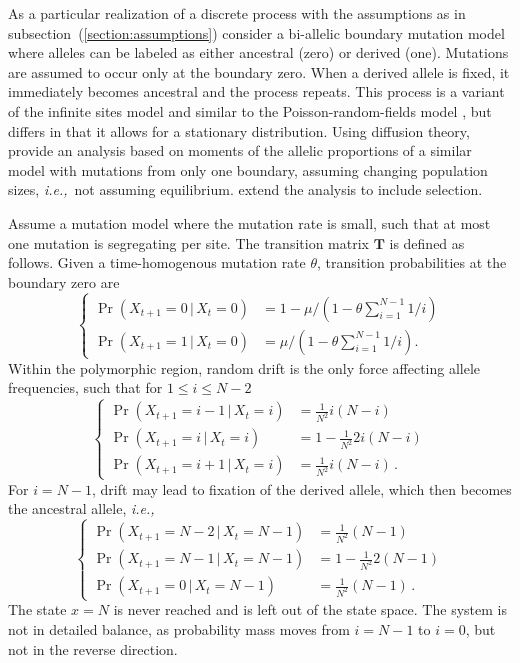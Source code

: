 \documentclass[preprint]{elsarticle}
\newcommand\given{{\,|\,}}
\newcommand\ie{{\it i.e.,}}
\newcommand\x[1]{\ensuremath{X_{#1}}}
\begin{document}
As a particular realization of a discrete process with the assumptions as in subsection~(\ref{section:assumptions}) consider a bi-allelic boundary mutation model where alleles can be labeled as either ancestral (zero) or derived (one). Mutations are assumed to occur only at the boundary zero. When a derived allele is fixed, it immediately becomes ancestral and the process repeats. This process is a variant of the infinite sites model \citep{Kimu69} and similar to the Poisson-random-fields model \citep{Sawy92}, but differs in that it allows for a stationary distribution. Using diffusion theory, \citet{Evan07} provide an analysis based on moments of the allelic proportions of a similar model with mutations from only one boundary, assuming changing population sizes, \ie\ not assuming equilibrium. \citet{Zivk15} extend the analysis to include selection. 

Assume a mutation model where the mutation rate is small, such that at most one mutation is segregating per site. The transition matrix $\mathbf{T}$ is defined as follows. Given a time-homogenous mutation rate $\theta$, transition probabilities at the boundary zero are 
\begin{equation}
\begin{cases}
\Pr(\x{t+1}=0\given \x{t}=0)&=1-\mu/(1-\theta\sum_{i=1}^{N-1}1/i)\\
\Pr(\x{t+1}=1\given \x{t}=0)&=\mu/(1-\theta\sum_{i=1}^{N-1}1/i).
\end{cases}
\end{equation}
Within the polymorphic region, random drift is the only force affecting allele frequencies, such that for $1\leq i \leq N-2$
\begin{equation}
\begin{cases}
\Pr(\x{t+1}=i-1\given \x{t}=i) &=\frac1{N^2} i(N-i)\\
\Pr(\x{t+1}=i\given \x{t}=i)   &=1-\frac1{N^2} 2i(N-i)\\
\Pr(\x{t+1}=i+1\given \x{t}=i) &=\frac1{N^2} i(N-i)\,.
\end{cases}
\end{equation}
For $i=N-1$, drift may lead to fixation of the derived allele, which then becomes the ancestral allele, \ie\
\begin{equation}
\begin{cases}
\Pr(\x{t+1}=N-2\given \x{t}=N-1) &=\frac1{N^2} (N-1)\\
\Pr(\x{t+1}=N-1\given \x{t}=N-1) &=1-\frac1{N^2} 2(N-1)\\
\Pr(\x{t+1}=0\given \x{t}=N-1)   &=\frac1{N^2} (N-1)\,.
\end{cases}
\end{equation}
The state $x=N$ is never reached and is left out of the state space. The system is not in detailed balance, as probability mass moves from $i=N-1$ to $i=0$, but not in the reverse direction.
\end{document}
